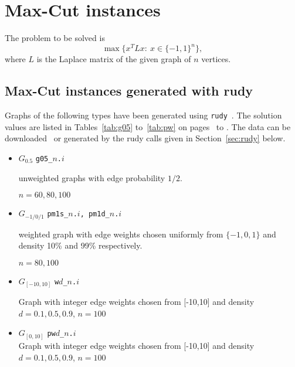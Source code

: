 \documentclass[a4paper, 12pt]{article}
\begin{document}
\section{Max-Cut instances}
The problem to be solved is
\[
\max \{ x^T L x: ~x \in \{ -1,1 \}^n \},
\]
where $L$ is the Laplace matrix of the given graph of $n$ vertices. 

\subsection{Max-Cut instances generated with rudy} \label{sec:mc}
Graphs of the following types have been generated using
\texttt{rudy}~\cite{Ri}. The solution values are listed in
Tables~\ref{tab:g05} to~\ref{tab:pw} on pages~\pageref{tab:g05} to
\pageref{tab:pw}. The data can be downloaded~\cite{Wi:07} or generated
by the rudy calls given in Section~\ref{sec:rudy} below.

\begin{itemize}
\item $G_{0.5}$ {\tt g05\_$n$.$i$} 

unweighted graphs with edge probability $1/2$. 

$n=60,80,100$
\item $G_{-1/0/1}$ {\tt pm1s\_$n$.$i$, pm1d\_$n$.$i$}

weighted graph with edge weights chosen uniformly from $\{-1,0,1\}$
and density 10\% and 99\% respectively.

$n=80,100$
\item $G_{[-10,10]}$ {\tt w$d$\_$n$.$i$}

Graph with integer edge weights chosen from [-10,10] and
 density $d=0.1,0.5,0.9$, $n=100$
\item $G_{[0,10]}$ {\tt pw$d$\_$n$.$i$}\\ Graph with integer edge
  weights chosen from [-10,10] and 
  density $d=0.1,0.5,0.9$, $n=100$
\end{itemize}
\end{document}
